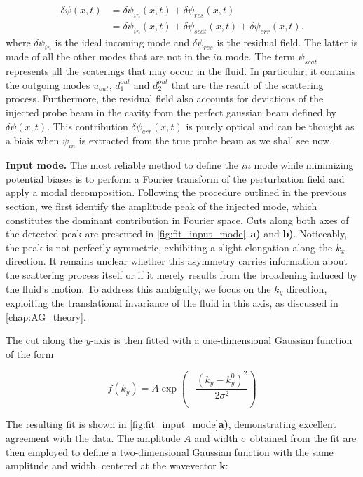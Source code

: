 \begin{equation}
    \begin{aligned}
    \delta\psi(x,t) &= \delta \psi_{in}(x,t)+\delta \psi_{res}(x,t) \\
    &= \delta \psi_{in}(x,t) + \delta \psi_{scat}(x,t) + \delta \psi_{err}(x,t).
    \end{aligned}
\label{eq:scat_decomp}
\end{equation}
where $\delta \psi_{in}$ is the ideal incoming mode and $\delta \psi_{res}$ is the residual field. The latter is made of all the other modes that are not in the $in$ mode. The term $\psi_{scat}$ represents all the scaterings that may 
occur in the fluid. In particular, it contains the outgoing modes $u_{out}$, $d_1^{out}$ and $d_2^{out}$ that are the result of the scattering process. Furthermore, the residual field also accounts for deviations
of the injected probe beam in the cavity from the perfect gaussian beam defined by $\delta \psi(x,t)$. This contribution $\delta \psi_{err}(x,t)$ is purely optical and can be thought as a biais when $\psi_{in}$ is extracted from the true probe beam as we shall see now.

\bigskip

\textbf{Input mode.} The most reliable method to define the $in$ mode while minimizing potential biases is to perform a Fourier transform of the perturbation field and apply a modal decomposition.
 Following the procedure outlined in the previous section, we first identify the amplitude peak of the injected mode, which constitutes the dominant contribution in Fourier space. 
 Cuts along both axes of the detected peak are presented in \autoref{fig:fit_input_mode}~\textbf{a)} and \textbf{b)}.
Noticeably, the peak is not perfectly symmetric, exhibiting a slight elongation along the \( k_x \) direction. 
It remains unclear whether this asymmetry carries information about the scattering process itself or if it merely results from the broadening induced by the fluid's motion. 
To address this ambiguity, we focus on the \( k_y \) direction, exploiting the translational invariance of the fluid in this axis, as discussed in \autoref{chap:AG_theory}. 

The cut along the \( y \)-axis is then fitted with a one-dimensional Gaussian function of the form 

\[
f(k_y) = A \exp\left( -\frac{(k_y - k_y^0)^2}{2\sigma^2} \right)
\]

The resulting fit is shown in \autoref{fig:fit_input_mode}\textbf{a)}, demonstrating excellent agreement with the data. The amplitude \( A \) and width \( \sigma \) obtained from the fit are then employed to define a two-dimensional Gaussian function with the same amplitude and width, centered at the wavevector \( \mathbf{k} \):


